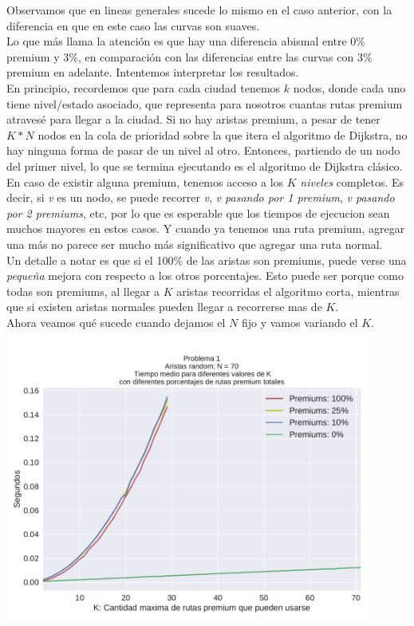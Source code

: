 Observamos que en lineas generales sucede lo mismo en el caso anterior, con la diferencia en que en este caso las curvas son suaves. \\

Lo que más llama la atención es que hay una diferencia abismal entre $0\%$ premium y $3\%$, en comparación con las diferencias entre las curvas con $3\%$ premium en adelante. Intentemos interpretar los resultados. \\

En principio, recordemos que para cada ciudad tenemos $k$ nodos, donde cada uno tiene nivel/estado asociado, que representa para nosotros cuantas rutas premium atravesé para llegar a la ciudad. Si no hay aristas premium, a pesar de tener $K*N$ nodos en la cola de prioridad sobre la que itera el algoritmo de Dijkstra, no hay ninguna forma de pasar de un nivel al otro. Entonces, partiendo de un nodo del primer nivel, lo que se termina ejecutando es el algoritmo de Dijkstra clásico. \\

En caso de existir alguna premium, tenemos acceso a los $K$ \textit{niveles} completos. Es decir, si \textit{v} es un nodo, se puede recorrer \textit{v}, \textit{v pasando por 1 premium}, \textit{v pasando por 2 premiums}, etc, por lo que es esperable que los tiempos de ejecucion sean muchos mayores en estos casos. Y cuando ya tenemos una ruta premium, agregar una más no parece ser mucho más significativo que agregar una ruta normal. \\

Un detalle a notar es que si el 100\% de las aristas son premiums, puede verse una \textit{pequeña} mejora con respecto a los otros porcentajes. Esto puede ser porque como todas son premiums, al llegar a $K$ aristas recorridas el algoritmo corta, mientras que si existen aristas normales pueden llegar a recorrerse mas de $K$. \\

Ahora veamos qué sucede cuando dejamos el $N$ fijo y vamos variando el $K$.

{\centering
  \includegraphics[width=0.9\textwidth]{imagenes/problema1/nfijo.pdf} \\
}


